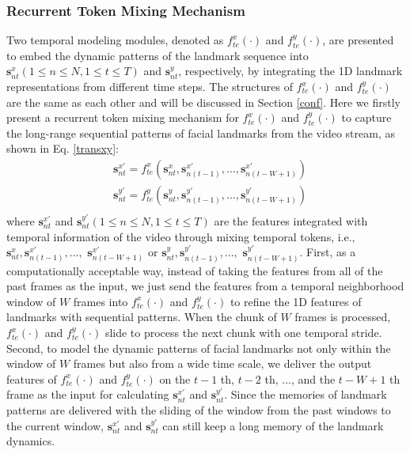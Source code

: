 \documentclass[review]{elsarticle}
\begin{document}
\subsubsection{Recurrent Token Mixing Mechanism}
Two temporal modeling modules, denoted as $f^x_{te}(\cdot)$ and $f^y_{te}(\cdot)$, are presented to embed the dynamic patterns of the landmark sequence into $\textbf{s}^x_{nt} (1\leq n \leq N, 1 \leq t \leq T)$ and $\textbf{s}^y_{nt}$, respectively, by integrating the 1D landmark representations from different time steps. The structures of $f^x_{te}(\cdot)$ and $f^y_{te}(\cdot)$ are the same as each other and will be discussed in Section \ref{conf}. Here we firstly present a recurrent token mixing mechanism for $f^x_{te}(\cdot)$ and $f^y_{te}(\cdot)$ to capture the long-range sequential patterns of facial landmarks from the video stream, as shown in Eq. \eqref{transxy}:
\begin{equation}
	\begin{split}
		\label{transxy}
		& \textbf{s}^{x'}_{nt} = f^x_{te}(\textbf{s}^{x}_{nt}, \textbf{s}^{x'}_{n(t-1)},...,\textbf{s}^{x'}_{n(t-W+1)})\\
		& \textbf{s}^{y'}_{nt} = f^y_{te}(\textbf{s}^{y}_{nt}, \textbf{s}^{y'}_{n(t-1)},...,\textbf{s}^{y'}_{n(t-W+1)})\\
	\end{split}
\end{equation}
where $\textbf{s}^{x'}_{nt}$ and $\textbf{s}^{y'}_{nt} (1\leq n \leq N, 1 \leq t \leq T)$ are the features integrated with temporal information of the video through mixing temporal tokens, i.e., $\textbf{s}^{x}_{nt}, \textbf{s}^{x'}_{n(t-1)},...,$ $\textbf{s}^{x'}_{n(t-W+1)}$ or $\textbf{s}^{y}_{nt}, \textbf{s}^{y'}_{n(t-1)},...,$ $\textbf{s}^{y'}_{n(t-W+1)}$. First, as a computationally acceptable way, instead of taking the features from all of the past frames as the input, we just send the features from a temporal neighborhood window of $W$ frames into $f^x_{te}(\cdot)$ and $f^y_{te}(\cdot)$ to refine the 1D features of landmarks with sequential patterns. When the chunk of $W$ frames is processed, $f^x_{te}(\cdot)$ and  $f^y_{te}(\cdot)$ slide to process the next chunk with one temporal stride. Second, to model the dynamic patterns of facial landmarks not only within the window of $W$ frames but also from a wide time scale, we deliver the output features of $f^x_{te}(\cdot)$ and $f^y_{te}(\cdot)$ on the $t-1$ th, $t-2$ th, ..., and the $t-W+1$ th frame as the input for calculating $\textbf{s}^{x'}_{nt}$ and $\textbf{s}^{y'}_{nt}$. Since the memories of landmark patterns are delivered with the sliding of the window from the past windows to the current window, $\textbf{s}^{x'}_{nt}$ and $\textbf{s}^{y'}_{nt}$ can still keep a long memory of the landmark dynamics.
\end{document}
